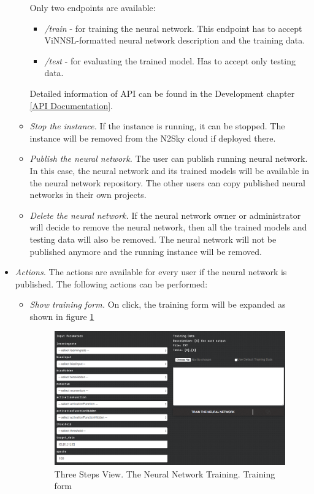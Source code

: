 \begin{itemize}
\begin{itemize}
Only two endpoints are available:
\begin{itemize}
\item \emph{/train} - for training the neural network. This endpoint has to accept ViNNSL-formatted neural network description and the training data. 
\item \emph{/test} - for evaluating the trained model. Has to accept only testing data.
\end{itemize}
Detailed information of API can be found in the Development chapter \autoref{API Documentation}.
\item \emph{Stop the instance.} If the instance is running, it can be stopped. The instance will be removed from the N2Sky cloud if  deployed there.
\item \emph{Publish the neural network.} The user can publish running neural network. In this case, the neural network and its trained models will be available in the neural network repository. The other users can copy published neural networks in their own projects. 
\item \emph{Delete the neural network.} If the neural network owner or administrator will decide to remove the neural network, then all the trained models and testing data will also be removed. The neural network will not be published anymore and the running instance will be removed.
\end{itemize}
\item \emph{Actions.} The actions are available for every user if the neural network is published. The following actions can be performed:
\begin{itemize}
\item \emph{Show training form.} On click, the training form will be expanded as shown in figure \ref{fig:expand_training_form}

\begin{figure}[H]
\begin{center}
  \includegraphics[width=\linewidth]{components/5/img/expand_training_form.png}
  \caption{Three Steps View. The Neural Network Training. Training form}
  \label{fig:expand_training_form}
\end{center}
\end{figure}


\end{itemize}
\end{itemize}
